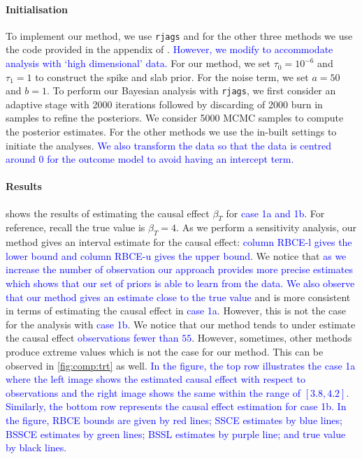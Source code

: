 \documentclass[preprint,12pt]{elsarticle}
\newcommand{\added}[1]{\textcolor{blue}{#1}}
\begin{document}
\paragraph{Initialisation} 
To implement our method, we use \texttt{rjags} \added{\citep{rjags2023}} and for the other three
methods we use the code provided in the appendix of \citep{koch2020}.
\added{However, we modify to accommodate analysis with `high dimensional'
	data.}
For our method, we set $\tau_0=10^{-6}$ and $\tau_1=1$ to construct the
spike and slab prior.
For the noise term, we set $a=50$ and $b=1$.
To perform 
our Bayesian analysis with \texttt{rjags}, we first consider an adaptive 
stage with 2000 iterations followed by discarding of 2000 burn in samples 
to refine the posteriors. We consider 5000 MCMC samples to compute the
posterior estimates. For the other methods we use the in-built settings 
to initiate the analyses. \added{We also transform the data so that the data is centred around $0$
for the outcome model to avoid having an intercept term.}

\paragraph{Results}
 shows the results of estimating the causal effect $\beta_T$
for \added{case 1a and 1b}.
For reference, recall the true value is $\beta_T=4$. 
As we perform a sensitivity analysis,
our method gives an interval estimate for the causal effect:
\added{column RBCE-l gives the lower bound
and column RBCE-u gives the upper bound}. We notice that 
\added{as we increase the number of observation our approach provides more precise estimates which shows that our set of priors is able to learn from the data. We also observe that our method gives an estimate close to the true value} and is more consistent
in terms of estimating the causal effect in \added{case 1a}. However, this is not the
case for the analysis with \added{case 1b}. We notice that our method tends to under
estimate the causal effect \added{observations fewer than $55$}. However, sometimes, other methods produce extreme 
values which is not the case for our method. This can be observed in \cref{fig:comp:trt} as well. \added{In the figure, the top row
illustrates the case 1a where the left image shows the estimated
causal effect with respect to observations and the right image
shows the same within the range of $[3.8,4.2]$. Similarly, the
bottom row represents the causal effect estimation for case 1b. In the figure, RBCE bounds are given by red lines; SSCE estimates by blue lines; BSSCE estimates by green lines; BSSL estimates by purple line; and true value by black lines. }
\end{document}
